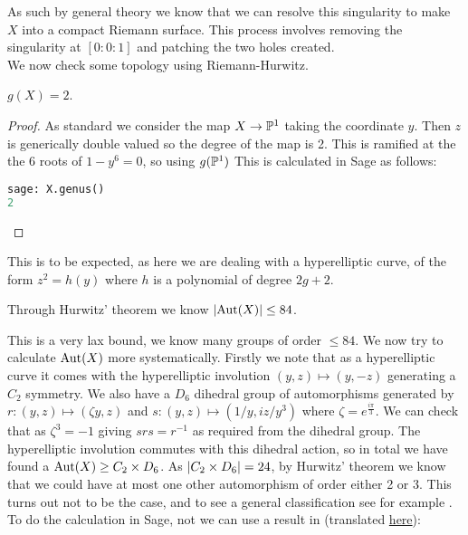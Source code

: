 \documentclass{article}
\begin{document}
As such by general theory we know that we can resolve this singularity to make $X$ into a compact Riemann surface. This process involves removing the singularity at $[0:0:1]$ and patching the two holes created. \\
We now check some topology using Riemann-Hurwitz. 
\begin{prop}
	$g(X) = 2$.
\end{prop}
\begin{proof}
	As standard we consider the map $X\to \mathbb{P}^1$ taking the coordinate $y$. Then $z$ is generically double valued so the degree of the map is 2. This is ramified at the the 6 roots of $1-y^6=0$, so using $g(\mathbb{P}^1)$
This is calculated in Sage as follows:
\begin{lstlisting}[language=Python,frame=single]
sage: X.genus()
2
\end{lstlisting}
\end{proof}
\begin{remark}
	This is to be expected, as here we are dealing with a hyperelliptic curve, of the form $z^2=h(y)$ where $h$ is a polynomial of degree $2g+2$. 
\end{remark}
\begin{corollary}
	Through Hurwitz' theorem we know $\left\lvert \operatorname{Aut}(X) \right\rvert \leq 84$.
\end{corollary}
This is a very lax bound, we know many groups of order $\leq 84$. We now try to calculate $\operatorname{Aut}(X)$ more systematically. Firstly we note that as a hyperelliptic curve it comes with the hyperelliptic involution $(y,z) \mapsto(y,-z)$ generating a $C_2$ symmetry. We also have a $D_6$ dihedral group of automorphisms generated by $r:(y,z) \mapsto (\zeta y, z)$ and $s:(y,z) \mapsto (1/y,iz/y^3)$ where $\zeta = e^{\frac{i\pi}{3}}$. We can check that as $\zeta^3=-1$ 
giving $srs=r^{-1}$ as required from the dihedral group. The hyperelliptic involution commutes with this dihedral action, so in total we have found a $\operatorname{Aut}(X) \geq C_2 \times D_6$. As $\left\lvert C_2 \times D_6 \right\rvert=24$, by Hurwitz' theorem we know that we could have at most one other automorphism of order either 2 or 3. This turns out not to be the case, and to see a general classification see for example \cite{Muller2017}. \\
To do the calculation in Sage, not we can use a result in \cite{Lauter2001} (translated \href{https://www.arxiv-vanity.com/papers/1811.07007/}{here}):
\end{document}
